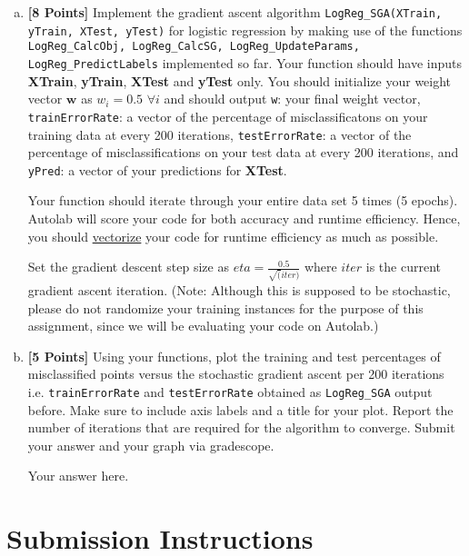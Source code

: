 \documentclass[a4paper]{article}
\theoremstyle{definition}
\def\w{\mathbf w}
\newcommand \code [1]{{\tt #1}}
\newenvironment{soln}{
    \leavevmode\color{red}\ignorespaces
}{}
\begin{document}
\begin{enumerate}[(a)]
\item {\bf [8 Points]} Implement the gradient ascent algorithm \code{LogReg\_SGA(XTrain, yTrain, XTest, yTest)} for logistic regression by making use of the functions \code{LogReg\_CalcObj, LogReg\_CalcSG, LogReg\_UpdateParams, LogReg\_PredictLabels} implemented so far.  Your function should have inputs \textbf{XTrain}, \textbf{yTrain}, \textbf{XTest} and \textbf{yTest} only. You  should  initialize  your  weight  vector  $\w$  as $w_i= 0.5$ $\forall i$ and should output \code{w}: your final weight vector, \code{trainErrorRate}: a vector of the percentage of misclassificatons on your training data at every 200 iterations, \code{testErrorRate}: a vector of the percentage of misclassifications on your test data at every 200 iterations, and \code{yPred}: a vector of your predictions for \textbf{XTest}.

Your function should iterate through your entire data set 5 times (5 epochs). Autolab will score your code for both accuracy and runtime efficiency. Hence, you should \href{https://www.cs.cornell.edu/courses/cs1112/2013fa/Exams/exam2/vectorizedCode.pdf}{vectorize} your code for runtime efficiency as much as possible.

Set the gradient descent step size as $eta = \frac{0.5}{\sqrt(iter)}$ where $iter$ is the current gradient ascent iteration. (Note: Although this is supposed to be stochastic, please do not randomize your training instances for the purpose of this assignment, since we will be evaluating your code on Autolab.)\\

\item {\bf [5 Points]}  Using your functions, plot the training and test percentages of misclassified points versus the stochastic gradient ascent per 200 iterations i.e. \code{trainErrorRate} and \code{testErrorRate} obtained as \code{LogReg\_SGA} output before. Make sure to include axis labels and a title for your plot. Report the number of iterations that are required for the algorithm to converge.  Submit your answer and your graph via gradescope.

\begin{soln}
Your answer here.
\end{soln}

\end{enumerate}


\section{Submission Instructions}
\end{document}
